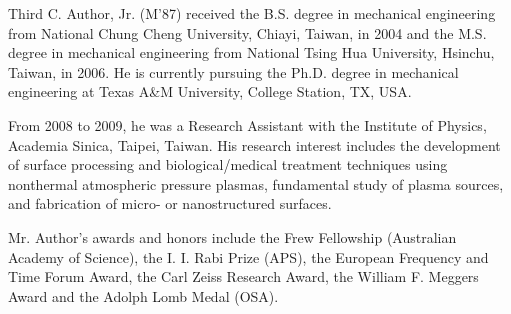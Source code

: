 \documentclass{ieeeaccess}
\begin{document}
\newpage


\begin{IEEEbiographynophoto}{Third C. Author, Jr.} (M'87) received the B.S. degree in mechanical
engineering from National Chung Cheng University, Chiayi, Taiwan, in 2004
and the M.S. degree in mechanical engineering from National Tsing Hua
University, Hsinchu, Taiwan, in 2006. He is currently pursuing the Ph.D.
degree in mechanical engineering at Texas A\&M University, College
Station, TX, USA.

From 2008 to 2009, he was a Research Assistant with the Institute of
Physics, Academia Sinica, Taipei, Taiwan. His research interest includes the
development of surface processing and biological/medical treatment
techniques using nonthermal atmospheric pressure plasmas, fundamental study
of plasma sources, and fabrication of micro- or nanostructured surfaces.

Mr. Author's awards and honors include the Frew Fellowship (Australian
Academy of Science), the I. I. Rabi Prize (APS), the European Frequency and
Time Forum Award, the Carl Zeiss Research Award, the William F. Meggers
Award and the Adolph Lomb Medal (OSA).
\end{IEEEbiographynophoto}

\EOD
\end{document}
